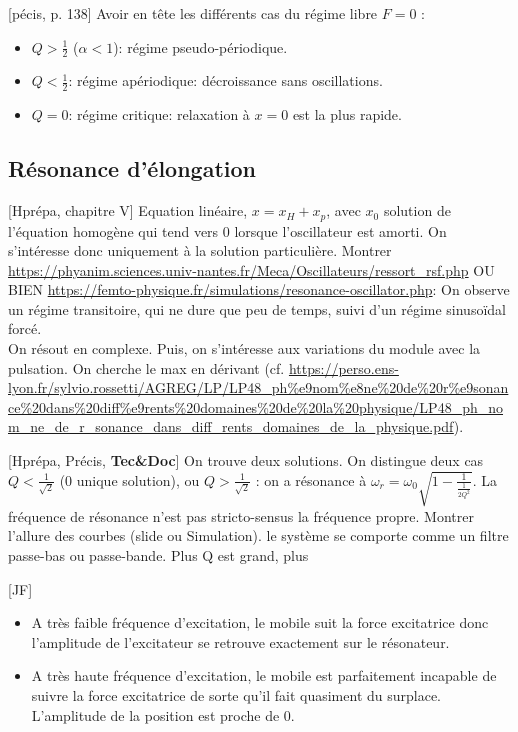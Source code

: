 \documentclass[11pt]{report}
\numberwithin{figure}{section}
\numberwithin{equation}{section}
\numberwithin{table}{section}
\newcommand{\1}{\boldsymbol{1}}
\begin{document}
[pécis, p. 138] Avoir en tête les différents cas du régime libre $F=0$ : 
\begin{itemize}
\item $Q > \frac{1}{2}$ ($\alpha<1$): régime pseudo-périodique.
\item $Q < \frac{1}{2}$: régime apériodique: décroissance sans oscillations.
\item $Q=0$: régime critique: relaxation à $x=0$ est la plus rapide.
\end{itemize}

\subsection{Résonance d'élongation}

[Hprépa, chapitre V] Equation linéaire, $x = x_H + x_p$, avec $x_0$ solution de l'équation homogène qui tend vers 0 lorsque l'oscillateur est amorti. On s'intéresse donc uniquement à la solution particulière. Montrer \url{https://phyanim.sciences.univ-nantes.fr/Meca/Oscillateurs/ressort_rsf.php} OU BIEN \url{https://femto-physique.fr/simulations/resonance-oscillator.php}: On observe un régime transitoire, qui ne dure que peu de temps, suivi d'un régime sinusoïdal forcé. \\

On résout en complexe. Puis, on s'intéresse aux variations du module avec la pulsation.  On cherche le max en dérivant (cf. \url{https://perso.ens-lyon.fr/sylvio.rossetti/AGREG/LP/LP48_ph%e9nom%e8ne%20de%20r%e9sonance%20dans%20diff%e9rents%20domaines%20de%20la%20physique/LP48_ph_nom_ne_de_r_sonance_dans_diff_rents_domaines_de_la_physique.pdf}).

[Hprépa, Précis, \textbf{Tec\&Doc}] On trouve deux solutions. On distingue deux cas $Q < \frac{1}{\sqrt{2}}$ ($0$ unique solution), ou $Q > \frac{1}{\sqrt{2}}$ : on a résonance à $\omega_r = \omega_0 \sqrt{1 - \frac{1}{\frac{1}{2Q^2}}}$. La fréquence de résonance n'est pas stricto-sensus la fréquence propre. Montrer l'allure des courbes (slide ou Simulation). le système se comporte comme un filtre passe-bas ou passe-bande. Plus Q est grand, plus 

[JF]
\begin{itemize}
\item  A très faible fréquence d’excitation, le mobile suit la force excitatrice donc l’amplitude de l’excitateur se retrouve
exactement sur le résonateur. 
\item A très haute fréquence d’excitation, le mobile est parfaitement incapable de suivre la force excitatrice de sorte
qu’il fait quasiment du surplace. L’amplitude de la position est proche de 0.
\end{itemize}
\end{document}
